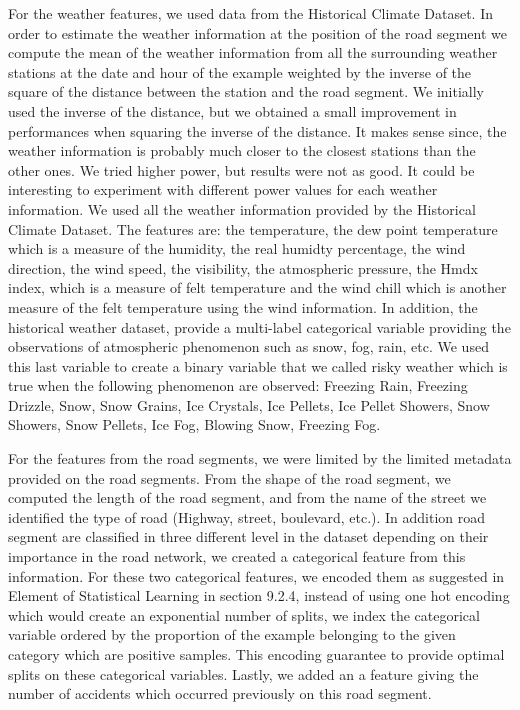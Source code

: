 \documentclass[conference]{IEEEtran}
\begin{document}
For the weather features, we used data from the Historical Climate Dataset. In order to estimate the weather information at the position of the road segment we compute the mean of the weather information from all  the surrounding weather stations at the date and hour of the example  weighted by the inverse of the square of the distance between the station and the road segment. We initially used the inverse of the distance, but we obtained a small improvement in performances when squaring the inverse of the distance. It makes sense since, the weather information is probably much closer to the closest stations than the other ones. We tried higher power, but results were not as good. It could be interesting to experiment with different power values for each weather information. We used all the weather information provided by the Historical Climate Dataset. The features are: the temperature, the dew point temperature which is a measure of the humidity, the real humidty percentage, the wind direction, the wind speed, the visibility, the atmospheric pressure, the Hmdx index, which is a measure of felt temperature and the wind chill which is another measure of the felt temperature using the wind information. In addition, the historical weather dataset, provide a multi-label categorical variable providing the observations of atmospheric phenomenon such as snow, fog, rain, etc. We used this last variable to create a binary variable that we called risky weather which is true when the following phenomenon are observed: Freezing Rain, Freezing Drizzle, Snow, Snow Grains, Ice Crystals, Ice Pellets, Ice Pellet Showers, Snow Showers, Snow Pellets, Ice Fog, Blowing Snow, Freezing Fog.

For the features from the road segments, we were limited by the limited metadata provided on the road segments. From the shape of the road segment, we computed the length of the road segment, and from the name of the street we identified the type of road (Highway, street, boulevard, etc.). In addition road segment are classified in three different level in the dataset depending on their importance in the road network, we created a categorical feature from this information. For these two categorical features, we encoded them as suggested in Element of Statistical Learning\cite{elementsofstat} in section 9.2.4, instead of using one hot encoding which would create an exponential number of splits, we index the categorical variable ordered by the proportion of the example belonging to the given category which are positive samples. This encoding guarantee to provide optimal splits on these categorical variables. Lastly, we added an a feature giving the number of accidents which occurred previously on this road segment.
\end{document}
